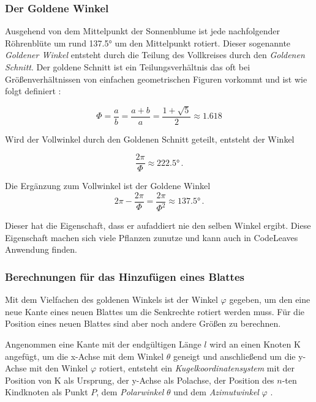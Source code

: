 \subsubsection*{Der Goldene Winkel}
Ausgehend von dem Mittelpunkt der Sonnenblume ist jede nachfolgender Röhrenblüte um rund \ang{137.5} um den Mittelpunkt rotiert. Dieser sogenannte \textit{Goldener Winkel} entsteht durch die Teilung des Vollkreises durch den \textit{Goldenen Schnitt}. Der goldene Schnitt ist ein Teilungsverhältnis das oft bei Größenverhältnissen von einfachen geometrischen Figuren vorkommt und ist wie folgt definiert \cite{wolfram2017golden}:

\begin{equation}
  \Phi = \frac{a}{b} = \frac{a + b}{a} = \frac{1 + \sqrt{5}}{2} \approx 1.618
\end{equation}

Wird der Vollwinkel durch den Goldenen Schnitt geteilt, entsteht der Winkel

\begin{equation}
  \frac{2\pi}{\Phi} \approx \ang{222.5} \,.
\end{equation}

Die Ergänzung zum Vollwinkel ist der Goldene Winkel
\begin{equation}
  2\pi - \frac{2\pi}{\Phi} = \frac{2\pi}{\Phi^2} \approx \ang{137.5} \,.
\end{equation}

Dieser hat die Eigenschaft, dass er aufaddiert nie den selben Winkel ergibt. Diese Eigenschaft machen sich viele Pflanzen zunutze und kann auch in CodeLeaves Anwendung finden.

\subsubsection*{Berechnungen für das Hinzufügen eines Blattes}
Mit dem Vielfachen des goldenen Winkels ist der Winkel $\varphi$ gegeben, um den eine neue Kante eines neuen Blattes um die Senkrechte rotiert werden muss. Für die Position eines neuen Blattes sind aber noch andere Größen zu berechnen.

Angenommen eine Kante mit der endgültigen Länge $l$ wird an einen Knoten K angefügt, um die x-Achse mit dem Winkel $\theta$ geneigt und anschließend um die y-Achse mit den Winkel $\varphi$ rotiert, entsteht ein \textit{Kugelkoordinatensystem} mit der Position von K als Ursprung, der y-Achse als Polachse, der Position des $n$-ten Kindknoten als Punkt $P$, dem \emph{Polarwinkel} $\theta$ und dem \emph{Azimutwinkel} $\varphi$ \cite{papula2001mathematik}.

